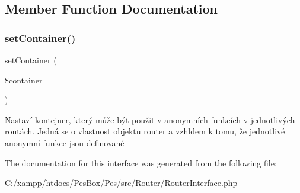 \subsection{Member Function Documentation}
\mbox{\label{interface_pes_1_1_router_1_1_router_interface_abdef16a38dcfab7dc5e5f4e9c50269a3}} 
\subsubsection{\texorpdfstring{set\+Container()}{setContainer()}}
{\footnotesize\ttfamily set\+Container (\begin{DoxyParamCaption}\item[{Container\+Interface}]{\$container }\end{DoxyParamCaption})}

Nastaví kontejner, který může být použit v anonymních funkcích v jednotlivých routách. Jedná se o vlastnost objektu router a vzhldem k tomu, že jednotlivé anonymní funkce jsou definované 

The documentation for this interface was generated from the following file\+:\begin{DoxyCompactItemize}
\item 
C\+:/xampp/htdocs/\+Pes\+Box/\+Pes/src/\+Router/Router\+Interface.\+php\end{DoxyCompactItemize}
